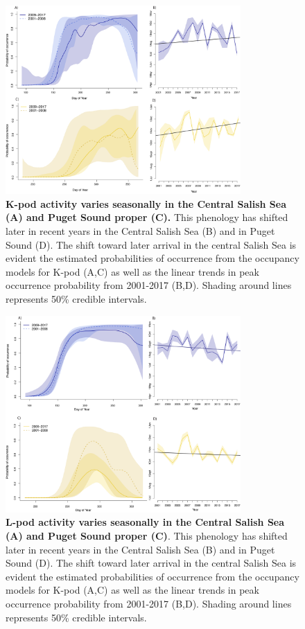 \documentclass{article}
\begin{document}
\begin{figure}[!hp]
\includegraphics[width=0.8\textwidth]{../analyses/figures/proboccK_4panels.png} 
\caption{\textbf{K-pod activity varies seasonally in the Central Salish Sea (A) and Puget Sound proper (C).} This phenology has shifted later in recent years in the Central Salish Sea (B) and in Puget Sound (D). The shift toward later arrival in the central Salish Sea is evident the estimated probabilities of occurrence from the occupancy models for K-pod (A,C) as well as the linear trends in peak occurrence probability from 2001-2017 (B,D). Shading around lines represents 50\% credible intervals. 
}
\label{fig:Kprobs}
\end{figure}


\begin{figure}[!hp]
\includegraphics[width=0.8\textwidth]{../analyses/figures/proboccL_4panels.png} 
\caption{\textbf{L-pod activity varies seasonally in the Central Salish Sea (A) and Puget Sound proper (C)}. This phenology has shifted later in recent years in the Central Salish Sea (B) and in Puget Sound (D). The shift toward later arrival in the central Salish Sea is evident the estimated probabilities of occurrence from the occupancy models for K-pod (A,C) as well as the linear trends in peak occurrence probability from 2001-2017 (B,D). Shading around lines represents 50\% credible intervals. 
}
\label{fig:Lprobs}
\end{figure}
\pagebreak


  
\end{document}
